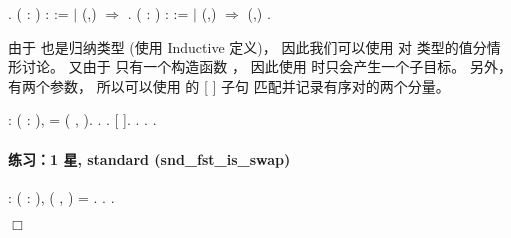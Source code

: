 \documentclass[12pt]{report}
\begin{document}
{{{\begin{coqdoccode}
\coqdocindent{1.00em}
.\coqdoceol
\coqdocemptyline
\coqdocnoindent
{}  ( : ) :  :=\coqdoceol
\coqdocindent{1.00em}
  \coqdoceol
\coqdocindent{1.00em}
\ensuremath{|} (,) \ensuremath{\Rightarrow} \coqdoceol
\coqdocindent{1.00em}
.\coqdoceol
\coqdocemptyline
\coqdocnoindent
{}  ( : ) :  :=\coqdoceol
\coqdocindent{1.00em}
  \coqdoceol
\coqdocindent{1.00em}
\ensuremath{|} (,) \ensuremath{\Rightarrow} (,)\coqdoceol
\coqdocindent{1.00em}
.\coqdoceol
\coqdocemptyline
\end{coqdoccode}
  由于  也是归纳类型 (使用 Inductive 定义)，
  因此我们可以使用  对  类型的值分情形讨论。
  又由于  只有一个构造函数 ，
  因此使用  时只会产生一个子目标。
  另外， 有两个参数，
  所以可以使用  的  [ ] 子句
  匹配并记录有序对的两个分量。 
\begin{coqdoccode}
\coqdocnoindent
{}  : \coqdockw{\ensuremath{\forall}} ( : ),\coqdoceol
\coqdocindent{1.00em}
 = ( ,  ).\coqdoceol
\coqdocnoindent
{}.\coqdoceol
\coqdocindent{1.00em}
 .\coqdoceol
\coqdocindent{1.00em}
   [ ]. \coqdocindent{1.00em}
. .\coqdoceol
\coqdocnoindent
{}.\coqdoceol
\coqdocemptyline
\end{coqdoccode}
\paragraph{练习：1 星, standard (snd\_fst\_is\_swap)}

\begin{coqdoccode}
\coqdocnoindent
{}  : \coqdockw{\ensuremath{\forall}} ( : ),\coqdoceol
\coqdocindent{1.00em}
( ,  ) =  .\coqdoceol
\coqdocnoindent
{}.\coqdoceol
\coqdocnoindent
{}.\coqdoceol
\end{coqdoccode}
\ensuremath{\Box} 

}}}
\end{document}
